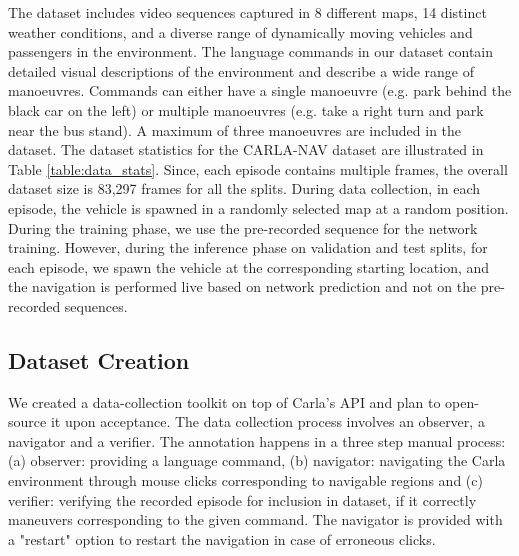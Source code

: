 \documentclass[letterpaper, 10 pt, conference]{ieeeconf}  %
\begin{document}
The dataset includes video sequences captured in 8 different maps, 14 distinct weather conditions, and a diverse range of dynamically moving vehicles and passengers in the environment. The language commands in our dataset contain detailed visual descriptions of the environment and describe a wide range of manoeuvres. Commands can either have a single manoeuvre (e.g. park behind the black car on the left) or multiple manoeuvres (e.g. take a right turn and park near the bus stand). A maximum of three manoeuvres are included in the dataset. The dataset statistics for the CARLA-NAV dataset are illustrated in Table \ref{table:data_stats}. Since, each episode contains multiple frames, the overall dataset size is 83,297 frames for all the splits. During data collection, in each episode, the vehicle is spawned in a randomly selected map at a random position. During the training phase, we use the pre-recorded sequence for the network training. However, during the inference phase on validation and test splits, for each episode, we spawn the vehicle at the corresponding starting location, and the navigation is performed live based on network prediction and not on the pre-recorded sequences.


\subsection{Dataset Creation}

We created a data-collection toolkit on top of Carla's API and plan to open-source it upon acceptance. The data collection process involves an observer, a navigator and a verifier. The annotation happens in a three step manual process: (a) observer: providing a language command, (b) navigator: navigating the Carla environment through mouse clicks corresponding to navigable regions and (c) verifier: verifying the recorded episode for inclusion in dataset, if it correctly maneuvers corresponding to the given command.  The navigator is provided with a "restart" option to restart the navigation in case of erroneous clicks. 
\end{document}
